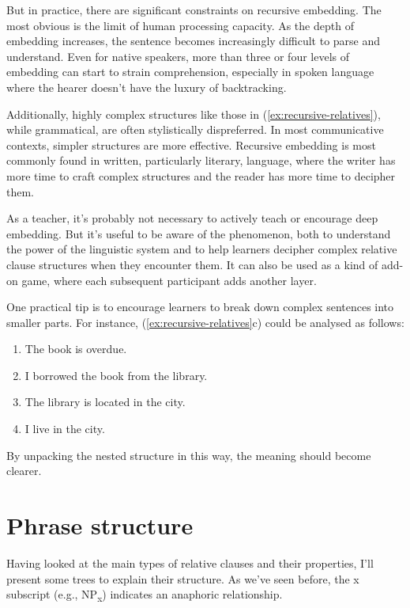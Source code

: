 But in practice, there are significant constraints on recursive embedding. The most obvious is the limit of human processing capacity. As the depth of embedding increases, the sentence becomes increasingly difficult to parse and understand. Even for native speakers, more than three or four levels of embedding can start to strain comprehension, especially in spoken language where the hearer doesn't have the luxury of backtracking.

Additionally, highly complex structures like those in (\ref{ex:recursive-relatives}), while grammatical, are often stylistically dispreferred. In most communicative contexts, simpler structures are more effective. Recursive embedding is most commonly found in written, particularly literary, language, where the writer has more time to craft complex structures and the reader has more time to decipher them.

As a teacher, it's probably not necessary to actively teach or encourage deep embedding. But it's useful to be aware of the phenomenon, both to understand the power of the linguistic system and to help learners decipher complex relative clause structures when they encounter them. It can also be used as a kind of add-on game, where each subsequent participant adds another layer.

One practical tip is to encourage learners to break down complex sentences into smaller parts. For instance, (\ref{ex:recursive-relatives}c) could be analysed as follows:

\begin{enumerate}[noitemsep]
    \item The book is overdue.
    \item I borrowed the book from the library.
    \item The library is located in the city.
    \item I live in the city.
\end{enumerate}

By unpacking the nested structure in this way, the meaning should become clearer.

\section{Phrase structure}

Having looked at the main types of relative clauses and their properties, I'll present some trees to explain their structure. As we've seen before, the x subscript (e.g., NP\textsubscript{x}) indicates an anaphoric relationship.

